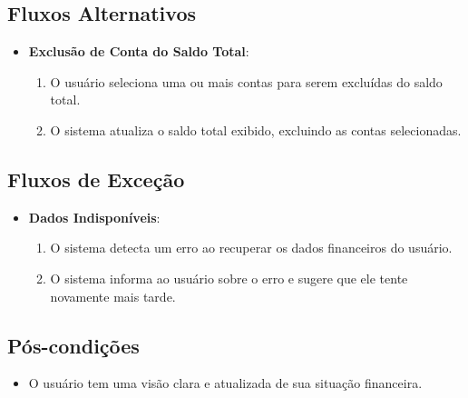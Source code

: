 \subsection*{Fluxos Alternativos}
\begin{addmargin}[1.5cm]{0cm}
    \begin{itemize}
        \item \textbf{Exclusão de Conta do Saldo Total}:
        \begin{enumerate}
            \item O usuário seleciona uma ou mais contas para serem excluídas do saldo total.
            \item O sistema atualiza o saldo total exibido, excluindo as contas selecionadas.
        \end{enumerate}
    \end{itemize}
\end{addmargin}

\subsection*{Fluxos de Exceção}
\begin{addmargin}[1.5cm]{0cm}
    \begin{itemize}
        \item \textbf{Dados Indisponíveis}:
        \begin{enumerate}
            \item O sistema detecta um erro ao recuperar os dados financeiros do usuário.
            \item O sistema informa ao usuário sobre o erro e sugere que ele tente novamente mais tarde.
        \end{enumerate}
    \end{itemize}
\end{addmargin}

\subsection*{Pós-condições}
\begin{addmargin}[1.5cm]{0cm}
    \begin{itemize}
        \item O usuário tem uma visão clara e atualizada de sua situação financeira.
    \end{itemize}
\end{addmargin}

